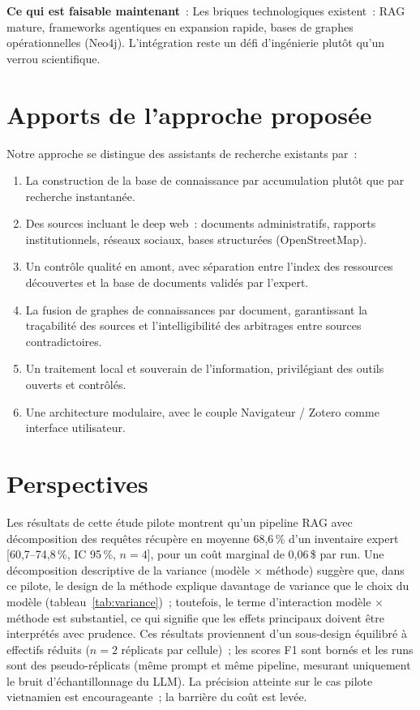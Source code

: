 \documentclass[a4paper,11pt]{report}
\begin{document}
\textbf{Ce qui est faisable maintenant}~: Les briques technologiques existent~: RAG mature, frameworks agentiques en expansion rapide, bases de graphes opérationnelles (Neo4j). L'intégration reste un défi d'ingénierie plutôt qu'un verrou scientifique.

\section{Apports de l'approche proposée}

Notre approche se distingue des assistants de recherche existants par~:

\begin{enumerate}
\item La construction de la base de connaissance par accumulation plutôt que par recherche instantanée.
\item Des sources incluant le deep web~: documents administratifs, rapports institutionnels, réseaux sociaux, bases structurées (OpenStreetMap).
\item Un contrôle qualité en amont, avec séparation entre l'index des ressources découvertes et la base de documents validés par l'expert.
\item La fusion de graphes de connaissances par document, garantissant la traçabilité des sources et l'intelligibilité des arbitrages entre sources contradictoires.
\item Un traitement local et souverain de l'information, privilégiant des outils ouverts et contrôlés.
\item Une architecture modulaire, avec le couple Navigateur / Zotero comme interface utilisateur.
\end{enumerate}

\section{Perspectives}

Les résultats de cette étude pilote montrent qu'un pipeline RAG avec décomposition des requêtes récupère en moyenne 68,6\,\% d'un inventaire expert [60,7--74,8\,\%, IC 95\,\%, $n=4$], pour un coût marginal de 0,06\,\$ par run. Une décomposition descriptive de la variance (modèle $\times$ méthode) suggère que, dans ce pilote, le design de la méthode explique davantage de variance que le choix du modèle (tableau~\ref{tab:variance})~; toutefois, le terme d'interaction modèle $\times$ méthode est substantiel, ce qui signifie que les effets principaux doivent être interprétés avec prudence. Ces résultats proviennent d'un sous-design équilibré à effectifs réduits ($n=2$ réplicats par cellule)~; les scores F1 sont bornés et les runs sont des pseudo-réplicats (même prompt et même pipeline, mesurant uniquement le bruit d'échantillonnage du LLM). La précision atteinte sur le cas pilote vietnamien est encourageante~; la barrière du coût est levée.
\end{document}
